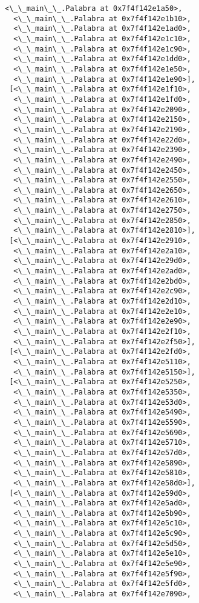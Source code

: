 \documentclass[12pt,a4paper,table]{article}
\begin{document}
\begin{tcolorbox}[breakable, size=fbox, boxrule=.5pt, pad at break*=1mm, opacityfill=0]
\begin{Verbatim}[commandchars=\\\{\}]
  <\_\_main\_\_.Palabra at 0x7f4f142e1a50>,
  <\_\_main\_\_.Palabra at 0x7f4f142e1b10>,
  <\_\_main\_\_.Palabra at 0x7f4f142e1ad0>,
  <\_\_main\_\_.Palabra at 0x7f4f142e1c10>,
  <\_\_main\_\_.Palabra at 0x7f4f142e1c90>,
  <\_\_main\_\_.Palabra at 0x7f4f142e1dd0>,
  <\_\_main\_\_.Palabra at 0x7f4f142e1e50>,
  <\_\_main\_\_.Palabra at 0x7f4f142e1e90>],
 [<\_\_main\_\_.Palabra at 0x7f4f142e1f10>,
  <\_\_main\_\_.Palabra at 0x7f4f142e1fd0>,
  <\_\_main\_\_.Palabra at 0x7f4f142e2090>,
  <\_\_main\_\_.Palabra at 0x7f4f142e2150>,
  <\_\_main\_\_.Palabra at 0x7f4f142e2190>,
  <\_\_main\_\_.Palabra at 0x7f4f142e22d0>,
  <\_\_main\_\_.Palabra at 0x7f4f142e2390>,
  <\_\_main\_\_.Palabra at 0x7f4f142e2490>,
  <\_\_main\_\_.Palabra at 0x7f4f142e2450>,
  <\_\_main\_\_.Palabra at 0x7f4f142e2550>,
  <\_\_main\_\_.Palabra at 0x7f4f142e2650>,
  <\_\_main\_\_.Palabra at 0x7f4f142e2610>,
  <\_\_main\_\_.Palabra at 0x7f4f142e2750>,
  <\_\_main\_\_.Palabra at 0x7f4f142e2850>,
  <\_\_main\_\_.Palabra at 0x7f4f142e2810>],
 [<\_\_main\_\_.Palabra at 0x7f4f142e2910>,
  <\_\_main\_\_.Palabra at 0x7f4f142e2a10>,
  <\_\_main\_\_.Palabra at 0x7f4f142e29d0>,
  <\_\_main\_\_.Palabra at 0x7f4f142e2ad0>,
  <\_\_main\_\_.Palabra at 0x7f4f142e2bd0>,
  <\_\_main\_\_.Palabra at 0x7f4f142e2c90>,
  <\_\_main\_\_.Palabra at 0x7f4f142e2d10>,
  <\_\_main\_\_.Palabra at 0x7f4f142e2e10>,
  <\_\_main\_\_.Palabra at 0x7f4f142e2e90>,
  <\_\_main\_\_.Palabra at 0x7f4f142e2f10>,
  <\_\_main\_\_.Palabra at 0x7f4f142e2f50>],
 [<\_\_main\_\_.Palabra at 0x7f4f142e2fd0>,
  <\_\_main\_\_.Palabra at 0x7f4f142e5110>,
  <\_\_main\_\_.Palabra at 0x7f4f142e5150>],
 [<\_\_main\_\_.Palabra at 0x7f4f142e5250>,
  <\_\_main\_\_.Palabra at 0x7f4f142e5350>,
  <\_\_main\_\_.Palabra at 0x7f4f142e53d0>,
  <\_\_main\_\_.Palabra at 0x7f4f142e5490>,
  <\_\_main\_\_.Palabra at 0x7f4f142e5590>,
  <\_\_main\_\_.Palabra at 0x7f4f142e5690>,
  <\_\_main\_\_.Palabra at 0x7f4f142e5710>,
  <\_\_main\_\_.Palabra at 0x7f4f142e57d0>,
  <\_\_main\_\_.Palabra at 0x7f4f142e5890>,
  <\_\_main\_\_.Palabra at 0x7f4f142e5810>,
  <\_\_main\_\_.Palabra at 0x7f4f142e58d0>],
 [<\_\_main\_\_.Palabra at 0x7f4f142e59d0>,
  <\_\_main\_\_.Palabra at 0x7f4f142e5ad0>,
  <\_\_main\_\_.Palabra at 0x7f4f142e5b90>,
  <\_\_main\_\_.Palabra at 0x7f4f142e5c10>,
  <\_\_main\_\_.Palabra at 0x7f4f142e5c90>,
  <\_\_main\_\_.Palabra at 0x7f4f142e5d50>,
  <\_\_main\_\_.Palabra at 0x7f4f142e5e10>,
  <\_\_main\_\_.Palabra at 0x7f4f142e5e90>,
  <\_\_main\_\_.Palabra at 0x7f4f142e5f90>,
  <\_\_main\_\_.Palabra at 0x7f4f142e5fd0>,
  <\_\_main\_\_.Palabra at 0x7f4f142e7090>,

\end{Verbatim}
\end{tcolorbox}
\end{document}
